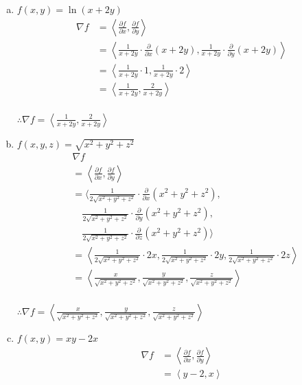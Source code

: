 \documentclass[12pt]{exam}
\newcommand{\pvec}[1]{\left\langle #1 \right\rangle} %
\begin{document}
\begin{questions}
\begin{enumerate}[a)]
  \end{enumerate}

  \begin{enumerate}[a)]
  \item $f(x, y) = \ln{(x + 2y)}$
    \begin{align*}
      \nabla f
      &= \pvec{\frac{\partial f}{\partial x}, \frac{\partial f}{\partial y}} \\
      &= \pvec{\frac{1}{x+2y}\cdot \frac{\partial}{\partial x}( x +2y), \frac{1}{x+2y} \cdot\frac{\partial}{\partial y}( x +2y)} \\
      &= \pvec{\frac{1}{x+2y} \cdot 1, \frac{1}{x+2y} \cdot 2} \\
      &= \pvec{\frac{1}{x+2y}, \frac{2}{x+2y}} \\
    \end{align*}

    $\therefore \nabla f = \pvec{\frac{1}{x+2y}, \frac{2}{x+2y}}$
  \item $f(x, y, z) = \sqrt{x^2+y^2+z^2}$
    \begin{align*}
      &\nabla f\\
      &= \pvec{\frac{\partial f}{\partial x}, \frac{\partial f}{\partial y}} \\
      &= \Big\langle \frac{1}{2\sqrt{x^2+y^2+z^2}}\cdot \frac{\partial}{\partial x}(x^2+y^2+z^2),\\
      &\quad \frac{1}{2\sqrt{x^2+y^2+z^2}}\cdot \frac{\partial}{\partial y}(x^2+y^2+z^2),\\
      & \quad \frac{1}{2\sqrt{x^2+y^2+z^2}}\cdot \frac{\partial}{\partial z}(x^2+y^2+z^2) \Big\rangle \\
      &= \pvec{\frac{1}{2\sqrt{x^2+y^2+z^2}}\cdot 2x,\frac{1}{2\sqrt{x^2+y^2+z^2}}\cdot 2y,\frac{1}{2\sqrt{x^2+y^2+z^2}}\cdot 2z}\\
      &= \pvec{\frac{x}{\sqrt{x^2+y^2+z^2}},\frac{y}{\sqrt{x^2+y^2+z^2}},\frac{z}{\sqrt{x^2+y^2+z^2}}}\\
    \end{align*}

    $\therefore \nabla f = \pvec{\frac{x}{\sqrt{x^2+y^2+z^2}},\frac{y}{\sqrt{x^2+y^2+z^2}},\frac{z}{\sqrt{x^2+y^2+z^2}}}$
  \item $f(x, y) = xy - 2x$
    \begin{align*}
      \nabla f
      &= \pvec{\frac{\partial f}{\partial x}, \frac{\partial f}{\partial y}} \\
      &= \pvec{y-2, x}
    \end{align*}


\end{enumerate}
\end{questions}
\end{document}
